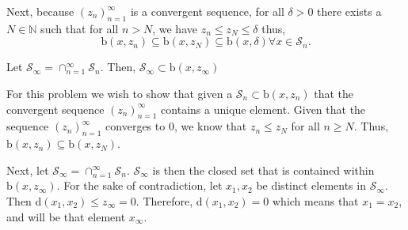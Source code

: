 \documentclass[12pt,letterpaper]{exam}
\begin{document}
\begin{questions}
\begin{solution}
    Next, because \((z_n)_{n=1}^{\infty}\) is a convergent sequence,
    for all \(\delta>0\) 
    there exists a \(N\in\mathbb{N}\)
    such that for all \(n>N\), we have
    \(z_n \leq z_N \leq \delta\)
    thus,
    \[\text{b}(x,z_n) \subseteq \text{b}(x,z_N) \subseteq \text{b}(x,\delta)
        \forall x\in \mathcal{S}_n.\]

    Let \(\mathcal{S}_\infty = \cap_{n=1}^\infty \mathcal{S}_n\).
    Then,
    \(\mathcal{S}_\infty \subset \text{b}(x,z_\infty)\)
    \vspace{2em}

    For this problem we wish to show that given a \(\mathcal{S}_n \subset \text{b}(x,z_n)\)
    that the convergent sequence \((z_n)_{n=1}^{\infty}\) contains a unique element.
    Given that the sequence \((z_n)_{n=1}^{\infty}\) converges to 0,
    we know that \(z_n \leq z_N\) for all \(n\geq N\).
    Thus, \(\text{b}(x,z_n) \subseteq \text{b}(x,z_N)\).

    Next, let \(\mathcal{S}_\infty = \cap_{n=1}^\infty \mathcal{S}_n\).
    \(\mathcal{S}_\infty\) is then the closed set that is contained within
    \(\text{b}(x,z_\infty)\).
    For the sake of contradiction,
    let \(x_1,x_2\) be distinct elements in \(\mathcal{S}_\infty\).
    Then d\((x_1,x_2)\leq z_\infty = 0\).
    Therefore, d\((x_1,x_2)=0\) which means that \(x_1=x_2\),
    and will be that element \(x_\infty\).
\end{solution}


\end{questions}
\end{document}
